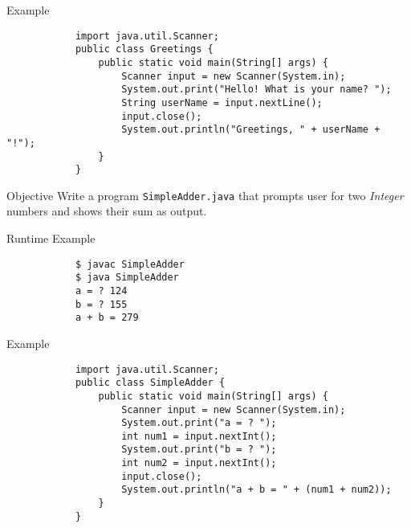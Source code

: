 \documentclass[10pt, compress]{beamer}
\begin{document}
\begin{slide}
	\begin{block}{Example}
		\begin{verbatim}
			import java.util.Scanner;
			public class Greetings {
			    public static void main(String[] args) {
			        Scanner input = new Scanner(System.in);
			        System.out.print("Hello! What is your name? ");
			        String userName = input.nextLine();
			        input.close();
			        System.out.println("Greetings, " + userName + "!");
			    }
			}
		\end{verbatim}
	\end{block}
\end{slide}

\begin{slide}
	\begin{block}{Objective}
		Write a program \texttt{SimpleAdder.java} that prompts user for two \textit{Integer} numbers and shows their sum as output.
	\end{block}
	\begin{block}{Runtime Example}
		\begin{verbatim}
			$ javac SimpleAdder
			$ java SimpleAdder
			a = ? 124
			b = ? 155
			a + b = 279
		\end{verbatim}
	\end{block}
\end{slide}

\begin{slide}
	\begin{block}{Example}
		\begin{verbatim}
			import java.util.Scanner;
			public class SimpleAdder {
			    public static void main(String[] args) {
			        Scanner input = new Scanner(System.in);
			        System.out.print("a = ? ");
			        int num1 = input.nextInt();
			        System.out.print("b = ? ");
			        int num2 = input.nextInt();
			        input.close();
			        System.out.println("a + b = " + (num1 + num2));
			    }
			}
		\end{verbatim}
	\end{block}
\end{slide}
\end{document}
